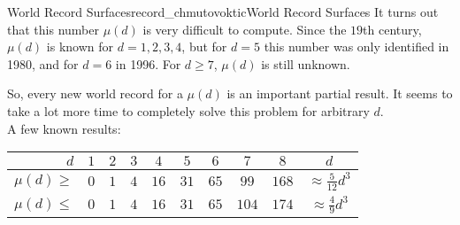 \begin{surferIntroPage}{World Record Surfaces}{record_chmutovoktic}{World Record Surfaces}
 It turns out that this number $\mu(d)$ is very difficult to compute.
    Since the $19$th century, $\mu(d)$ is known for $d=1,2,3,4$, but for $d=5$
    this number was only identified in 1980, and for $d=6$ in 1996.
    For $d\ge 7$, $\mu(d)$ is still unknown.
  
    So, every new world record for a $\mu(d)$ is an important partial result. It seems to take a lot more time to completely solve this problem for arbitrary $d$.\\  A few known results:
    
   \begin{center}
      \begin{tabular}{r|cccccccc|c}
        $d$ & $1$ & $2$ & $3$ & $4$ & $5$ & $6$ & $7$ & $8$ & $d$\\
        \hline
        \hline
        \rule{0pt}{1.2em}$\mu(d)\ge$ & $0$ & $1$ & $4$ & $16$ & $31$ & $65$ &
        $99$ & $168$ & 
        $\approx \frac{5}{12}d^3$\\[0.3em]
        \hline
        \rule{0pt}{1.2em}$\mu(d)\le$ & $0$ & $1$ & $4$ & $16$ & $31$ & $65$ &
        $104$ & $174$ & $\approx \frac{4}{9}d^3$
      \end{tabular}
    \end{center}
\end{surferIntroPage}
